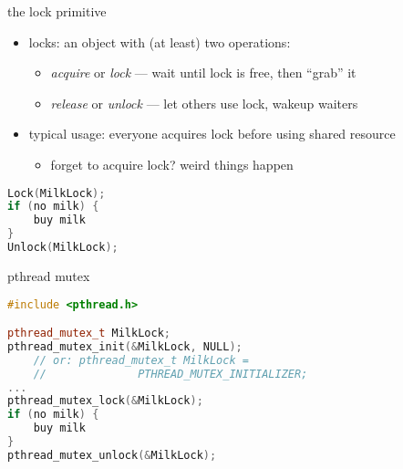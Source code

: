 \begin{frame}[fragile,label=lockDefn]{the lock primitive}
    \begin{itemize}
    \item locks: an object with (at least) two operations:
        \begin{itemize}
        \item \textit{acquire} or \textit{lock} --- wait until lock is free, then ``grab'' it
        \item \textit{release} or \textit{unlock} --- let others use lock, wakeup waiters
        \end{itemize}
    \item typical usage: everyone acquires lock before using shared resource
        \begin{itemize}
        \item forget to acquire lock? weird things happen
        \end{itemize}
    \end{itemize}
\begin{lstlisting}[language=C++,style=small]
Lock(MilkLock);
if (no milk) {
    buy milk
}
Unlock(MilkLock);
\end{lstlisting}
\end{frame}

\begin{frame}[fragile,label=pthreadMutex]{pthread mutex}
\begin{lstlisting}[language=C++,style=small]
#include <pthread.h>

pthread_mutex_t MilkLock;
pthread_mutex_init(&MilkLock, NULL);
    // or: pthread_mutex_t MilkLock =
    //              PTHREAD_MUTEX_INITIALIZER;
...
pthread_mutex_lock(&MilkLock);
if (no milk) {
    buy milk
}
pthread_mutex_unlock(&MilkLock);
\end{lstlisting}
\end{frame}
